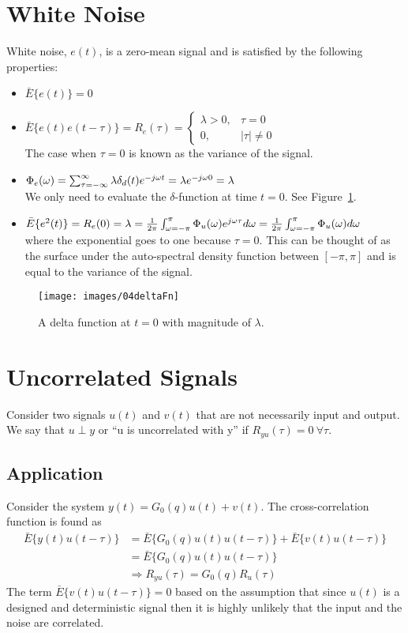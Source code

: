 \section{White Noise}
White noise, $e(t)$, is a zero-mean signal and is satisfied by the following properties:
\begin{itemize}
\item $\bar{E}\{e(t)\}=0$
\item $\bar{E}\{e(t)e(t-\tau)\} = R_e(\tau) = \begin{cases} \lambda>0, & \tau=0 \\ 0, & |\tau|\neq 0 \end{cases}$ \\
The case when $\tau=0$ is known as the variance of the signal.
\item $\Phi_e(\omega) = \sum_{\tau=-\infty}^\infty \lambda\delta_d(t)e^{-j\omega t} = \lambda e^{-j\omega 0} = \lambda$ \\
We only need to evaluate the $\delta$-function at time $t=0$.
See Figure~\ref{fig:04deltaFn}.
\item $\bar{E}\{e^2(t)\} = R_e(0) = \lambda = \frac{1}{2\pi}\int_{\omega=-\pi}^\pi\Phi_u(\omega)e^{j\omega\tau}d\omega = \frac{1}{2\pi} \int_{\omega=-\pi}^\pi\Phi_u(\omega)d\omega$ \\
where the exponential goes to one because $\tau=0$.
This can be thought of as the surface under the auto-spectral density function between $[-\pi,\pi]$ and is equal to the variance of the signal.
\end{itemize}

\begin{figure}[ht!]
\centering
\texttt{[image: images/04deltaFn]}
\caption{A delta function at $t=0$ with magnitude of $\lambda$.}%
\label{fig:04deltaFn}
\end{figure}

\section{Uncorrelated Signals}
Consider two signals $u(t)$ and $v(t)$ that are not necessarily input and output.
We say that $u\perp y$ or ``u is uncorrelated with y'' if $R_{yu}(\tau)=0~\forall \tau$.

\subsection{Application}
Consider the system $y(t)=G_0(q)u(t)+v(t)$.
The cross-correlation function is found as
\begin{align*}
\bar{E}\{y(t)u(t-\tau)\} &= \bar{E}\{G_0(q)u(t)u(t-\tau)\} + \bar{E}\{v(t)u(t-\tau)\} \\
&= \bar{E}\{G_0(q)u(t)u(t-\tau)\} \\
&\Rightarrow R_{yu}(\tau) = G_0(q)R_u(\tau)
\end{align*}
The term $\bar{E}\{v(t)u(t-\tau)\} = 0$ based on the assumption that since $u(t)$ is a designed and deterministic signal then it is highly unlikely that the input and the noise are correlated.

